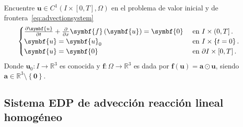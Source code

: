 Encuentre
\begin{math}
	\symbf{u}\in
	C^{1}\left(I\times\left[0,T\right],\Omega\right)
\end{math}
en el problema de valor inicial y de frontera~\eqref{eq:advectionsystem}
\begin{equation}\label{eq:advectionsystem}
	\begin{cases}
		\diffp{\symbf{u}}{t}+\diffp{}{x}\symbf{f}\left(\symbf{u}\right)=
		\symbf{0}     &
		\text{ en }I\times\left(0,T\right].   \\
		\symbf{u}                                                      =
		\symbf{u}_{0} &
		\text{ en }I\times\left\{t=0\right\}. \\
		\symbf{u}                                                      =
		\symbf{0}     &
		\text{ en }\partial I\times\left[0,T\right].
	\end{cases}
\end{equation}
Donde
\begin{math}
	\symbf{u}_{0}\colon I\to
	\mathbb{R}^{3}
\end{math}
es conocida y
\begin{math}
	\symbf{f}\colon\Omega\to
	\mathbb{R}^{3}
\end{math}
es dada por
\begin{math}
	\symbf{f}\left(\symbf{u}\right)=
	\symbf{a}\odot\symbf{u}
\end{math},
siendo $\symbf{a}\in\mathbb{R}^{3}\setminus\left\{\symbf{0}\right\}$.

\subsection*{Sistema EDP de advección reacción lineal homogéneo}

